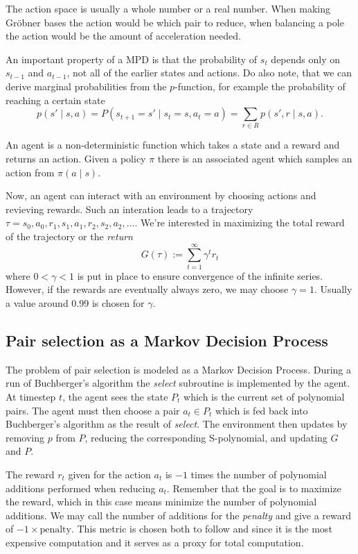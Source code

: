 \documentclass{article}
\theoremstyle{changedot}
\theoremstyle{changedotbreak}
\theoremstyle{nonumberplain}
\begin{document}
The action space is usually a whole number or a real number. When making Gröbner bases the action would be which pair to reduce, when balancing a pole the action would be the amount of acceleration needed.

An important property of a MPD is that the probability of $s_{t}$ depends only on $s_{t-1}$ and $a_{t-1}$, not all of the earlier states and actions. Do also note, that we can derive marginal probabilities from the $p$-function, for example the probability of reaching a certain state \[p(s' \mid s, a) = P(s_{t+1} = s' \mid s_{t} = s, a_{t} = a) = \sum_{r \in R} p(s', r \mid s, a).\]

An agent is a non-deterministic function which takes a state and a reward and returns an action. Given a policy $\pi$ there is an associated agent which samples an action from $\pi(a \mid s)$.

Now, an agent can interact with an environment by choosing actions and revieving rewards. Such an interation leads to a trajectory $\tau = s_{0}, a_{0}, r_{1}, s_{1}, a_{1}, r_{2}, s_{2}, a_{2}, \dots$. We're interested in maximizing the total reward of the trajectory or the \emph{return} \[G(\tau) := \sum_{t=1}^{\infty} \gamma^{t} r_{t}\] where $0 < \gamma < 1$ is put in place to ensure convergence of the infinite series. However, if the rewards are eventually always zero, we may choose $\gamma = 1$. Usually a value around 0.99 is chosen for $\gamma$.

\subsection{Pair selection as a Markov Decision Process}
The problem of pair selection is modeled as a Markov Decision Process. During a run of Buchberger's algorithm the \emph{select} subroutine is implemented by the agent. At timestep $t$, the agent sees the state $P_{t}$ which is the current set of polynomial pairs. The agent must then choose a pair $a_{t} \in P_{t}$ which is fed back into Buchberger's algorithm as the result of \emph{select}. The environment then updates by removing $p$ from $P$, reducing the corresponding S-polynomial, and updating $G$ and $P$.

The reward $r_{t}$ given for the action $a_{t}$ is $-1$ times the number of polynomial additions performed when reducing $a_{t}$. Remember that the goal is to maximize the reward, which in this case means minimize the number of polynomial additions. We may call the number of additions for the \emph{penalty} and give a reward of $-1 \times \text{penalty}$. This metric is chosen both to follow \cite{peifer} and since it is the most expensive computation and it serves as a proxy for total computation.
\end{document}
